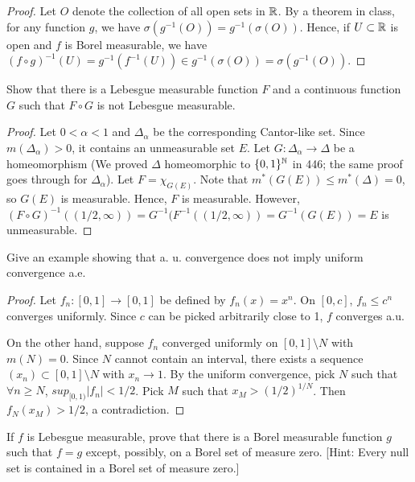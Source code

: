 \documentclass{article}
\begin{document}
\begin{proof}
Let $O$ denote the collection of all open sets in $\mathbb{R}$. By a theorem in class,  for any function $g$, we have $\sigma(g^{-1}(O)) = g^{-1}(\sigma(O))$.  Hence, if $U \subset \mathbb{R}$ is open  and $f$ is Borel measurable, we have
$(f\circ g)^{-1}(U) = g^{-1}(f^{-1}(U)) \in g^{-1}(\sigma(O)) = \sigma(g^{-1}(O))$.
\end{proof}
 Show that there is a Lebesgue measurable function $F$ and a continuous function $G$ such that $F \circ G$ is not Lebesgue measurable.
\begin{proof}
Let $0<\alpha<1$ and $\Delta_\alpha$ be the corresponding Cantor-like set.  Since $m(\Delta_\alpha) > 0$, it contains an unmeasurable set $E$.  Let $G:\Delta_\alpha \to \Delta$ be a homeomorphism (We proved $\Delta$ homeomorphic to $\{0,1\}^{\mathbb{N}}$ in 446; the same proof goes through for $\Delta_\alpha$). Let $F = \chi_{G(E)}$.
Note that $m^*(G(E)) \le m^*(\Delta) = 0$, so $G(E)$ is measurable. Hence, $F$ is measurable.  However, $(F\circ G)^{-1}((1/2, \infty)) = G^{-1}(F^{-1}((1/2,\infty)) = G^{-1}(G(E)) = E$ is unmeasurable.
\end{proof}
 Give an example showing that a. u. convergence does not imply uniform convergence a.e.
\begin{proof}
Let $f_n:[0,1] \to [0,1]$ be defined by $f_n(x) = x^n$. On $[0,c]$, $f_n \le c^n$ converges uniformly.  Since $c$ can be picked arbitrarily close to 1, $f$ converges a.u.  

On the other hand, suppose $f_n$ converged uniformly on $[0,1] \setminus N$ with $m(N) = 0$. Since $N$ cannot contain an interval, there exists a sequence $(x_n) \subset [0,1] \setminus N$ with $x_n \to 1$.  By the uniform convergence, pick $N$ such that $\forall n \ge N$, $sup_{[0,1)}|f_n| < 1/2$.  Pick $M$ such that $x_M > (1/2)^{1/N}$. Then $f_N(x_M) > 1/2$, a contradiction.
\end{proof}
 If $f$ is Lebesgue measurable, prove that there is a Borel measurable function $g$ such that $f = g$ except, possibly, on a Borel set of measure zero. [Hint: Every null set is contained in a Borel set of measure zero.]
\end{document}
